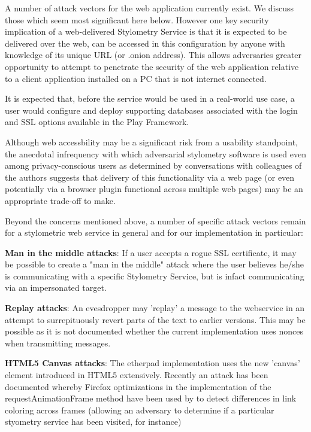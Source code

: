 \documentclass[letterpaper]{article}
\begin{document}
A number of attack vectors for the web application currently exist. We
discuss those which seem most significant here below. However one key
security implication of a web-delivered Stylometry Service is that it
is expected to be delivered over the web, can be accessed in this configuration by anyone with knowledge of its unique URL (or .onion
address). This allows adversaries greater opportunity to attempt to
penetrate the security of the web application relative to a client
application installed on a PC that is not internet connected.

It is expected that, before the service would be used in a real-world
use case, a user would configure and deploy supporting databases
associated with the login and SSL options available in the
Play Framework.

Although web accessbility may be a significant risk from a usability
standpoint, the anecdotal infrequency with which adversarial
stylometry software is used even among privacy-conscious users as
determined by conversations with colleagues of the authors
suggests that delivery of this functionality via a web page (or even
potentially via a browser plugin functional across multiple web pages)
may be an appropriate trade-off to make.

Beyond the concerns mentioned above, a number of specific attack
vectors remain for a stylometric web service in general and for our
implementation in particular:

{\bf Man in the middle attacks}: If a user accepts a rogue SSL certificate, it
may be possible to create a "man in the middle" attack where the user
believes he/she is communicating with a specific Stylometry Service,
but is infact communicating via an impersonated target.

{\bf Replay attacks}: An evesdropper may 'replay' a message to the
webservice in an attempt to surrepituously revert parts of the text to
earlier versions. This may be possible as it is not documented whether
the current implementation uses nonces when transmitting messages.

{\bf HTML5 Canvas attacks}: The etherpad implementation uses the new
'canvas' element introduced in HTML5 extensively. Recently an attack
has been documented \cite{BrowserTiming} whereby Firefox optimizations
in the implementation of the requestAnimationFrame method have been
used by to detect differences in link coloring across frames (allowing
an adversary to determine if a particular styometry service has been
visited, for instance)
\end{document}
